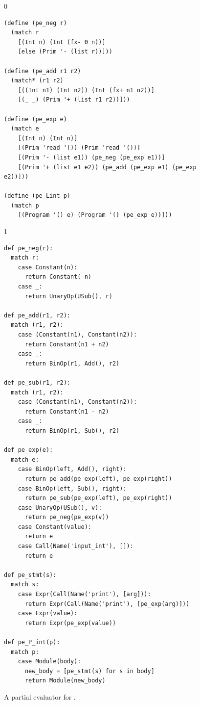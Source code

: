 \documentclass[7x10,nocrop]{TimesAPriori_MIT}%
\def\racketEd{0}
\def\pythonEd{1}
\def\edition{1}
\begin{document}
\begin{figure}[tp]
{\if\edition\racketEd
\begin{lstlisting}
(define (pe_neg r)
  (match r
    [(Int n) (Int (fx- 0 n))]
    [else (Prim '- (list r))]))

(define (pe_add r1 r2)
  (match* (r1 r2)
    [((Int n1) (Int n2)) (Int (fx+ n1 n2))]
    [(_ _) (Prim '+ (list r1 r2))]))

(define (pe_exp e)
  (match e
    [(Int n) (Int n)]
    [(Prim 'read '()) (Prim 'read '())]
    [(Prim '- (list e1)) (pe_neg (pe_exp e1))]
    [(Prim '+ (list e1 e2)) (pe_add (pe_exp e1) (pe_exp e2))]))

(define (pe_Lint p)
  (match p
    [(Program '() e) (Program '() (pe_exp e))]))
\end{lstlisting}
\fi}
{\if\edition\pythonEd
\begin{lstlisting}
def pe_neg(r):
  match r:
    case Constant(n):
      return Constant(-n)
    case _:
      return UnaryOp(USub(), r)
  
def pe_add(r1, r2):
  match (r1, r2):
    case (Constant(n1), Constant(n2)):
      return Constant(n1 + n2)
    case _:
      return BinOp(r1, Add(), r2)

def pe_sub(r1, r2):
  match (r1, r2):
    case (Constant(n1), Constant(n2)):
      return Constant(n1 - n2)
    case _:
      return BinOp(r1, Sub(), r2)
      
def pe_exp(e):
  match e:
    case BinOp(left, Add(), right):
      return pe_add(pe_exp(left), pe_exp(right))
    case BinOp(left, Sub(), right):
      return pe_sub(pe_exp(left), pe_exp(right))
    case UnaryOp(USub(), v):
      return pe_neg(pe_exp(v))
    case Constant(value):
      return e
    case Call(Name('input_int'), []):
      return e            

def pe_stmt(s):
  match s:
    case Expr(Call(Name('print'), [arg])):
      return Expr(Call(Name('print'), [pe_exp(arg)]))
    case Expr(value):
      return Expr(pe_exp(value))

def pe_P_int(p):
  match p:
    case Module(body):
      new_body = [pe_stmt(s) for s in body]
      return Module(new_body)
\end{lstlisting}
\fi}
\caption{A partial evaluator for \LangInt{}.}
\label{fig:pe-arith}
\end{figure}
\end{document}

